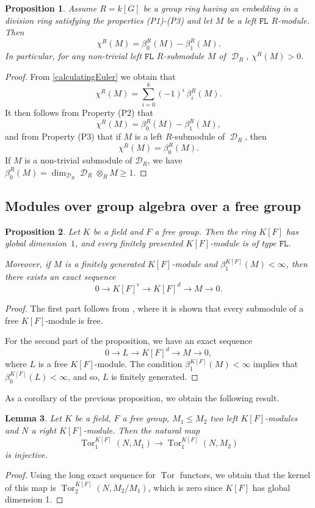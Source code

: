 \documentclass{amsart}
\newtheorem{lem}{Lemma}[section]
\newtheorem{pro}[lem]{Proposition}
\theoremstyle{definition}
\theoremstyle{remark}
\DeclareMathOperator{\D}{\mathcal D}
\newcommand{\FL}{\mathtt{FL}}
\DeclareMathOperator{\Tor}{Tor}
\begin{document}
\begin{pro}\label{positiveEuler} 
Assume $R=k[G]$ be a group ring having an embedding in a division ring satisfying the properties (P1)-(P3) and let $M$ be a left $\FL$ $R$-module. Then
$$\chi^R(M)=\beta_0^R(M)-\beta_1^R(M).$$
In particular, for any non-trivial   left $\FL$ $R$-submodule $M$ of $\D_R$,  $\chi^R(M)>0$.
\end{pro}
\begin{proof}From \cref{calculatingEuler} we obtain that
\[
\chi^R(M) = \sum_{i=0}^k (-1)^i \, \beta_i^R(M).
\]
It then follows from Property (P2) that
\[
\chi^R(M) = \beta_0^R(M)-\beta_1^R(M),
\]
and from Property (P3) that if  $M$ is a left   $R$-submodule  of $\D_R$, then 
\[
\chi^R(M) = \beta_0^R(M).
\]
If  $M$ is a non-trivial submodule of $\mathcal{D}_R$, we have $\beta_0^R(M)=\dim_{\D_R} \D_R\otimes _{R} M \geq 1$.
\end{proof}


\subsection{Modules over group algebra over a free group}
 
\begin{pro}\label{FLZF}   Let $K$ be a field and $F$ a free group.   Then the ring $K[F]$ has global dimension~$1$, and   every finitely presented $K[F]$-module  is of type $\FL$.

 Moreover, if $M$ is   a finitely generated $K[F]$-module and $\beta_1^{K[F]}(M)<\infty$, then there exists an exact sequence
$$0\to {K[F]}^r\to {K[F]}^d\to M\to 0.$$
\end{pro}
\begin{proof}
The first part follows from \cite[Corollary~5]{Co64}, where it is shown that every submodule of a free $K[F]$-module is free. 

For the second part of the proposition, we have an exact sequence 
\[
0 \longrightarrow L \longrightarrow K[F]^d \longrightarrow M \longrightarrow 0,
\]
where $L$ is a free $K[F]$-module. The condition $\beta_1^{K[F]}(M)<\infty$ implies that $\beta_0^{K[F]}(L)<\infty$, and so, $L$ is finitely generated.

\end{proof}
As a corollary of the previous proposition, we obtain the following result.            
\begin{lem}\label{0tor1} Let $K$ be a field, $F$ a free group, $M_1\le M_2$ two left $K[F]$-modules and $N$ a right  $K[F]$-module. Then  the natural map 
$$\Tor_1^{K[F]}(N,M_1)\to \Tor_1^{K[F]}(N,M_2)$$ is injective.
\end{lem}
\begin{proof}
Using the long exact sequence for $\Tor$ functors, we obtain that the kernel of this map is $\Tor_2^{K[F]}(N, M_2 / M_1)$, which is zero since $K[F]$ has global dimension 1.
\end{proof}
\end{document}
